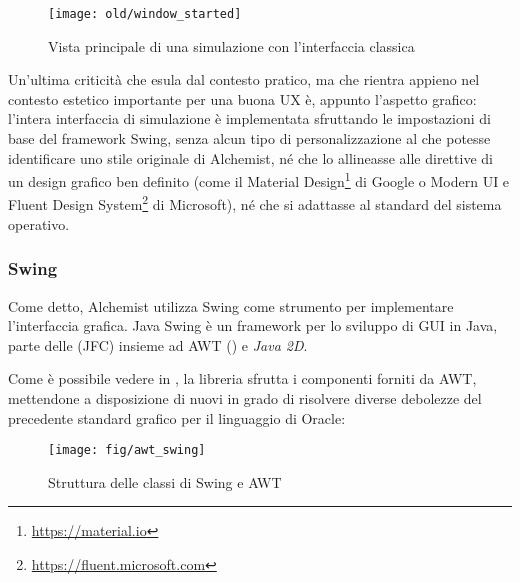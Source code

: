                 \begin{figure}[htbp]
                    \centering
                    \texttt{[image: old/window\_started]}
                    \caption{Vista principale di una simulazione con l'interfaccia classica}
                    \label{fig:oldMain}
                \end{figure}

                Un'ultima criticità che esula dal contesto pratico, ma che rientra appieno nel contesto estetico importante per una buona UX è, appunto l'aspetto grafico:
                l'intera interfaccia di simulazione è implementata sfruttando le impostazioni di base del framework Swing, senza alcun tipo di personalizzazione al  che potesse identificare uno stile originale di Alchemist, né che lo allineasse alle direttive di un design grafico ben definito (come il Material Design\footnote{\url{https://material.io}} di Google o Modern UI e Fluent Design System\footnote{\url{https://fluent.microsoft.com}} di Microsoft), né che si adattasse al  standard del sistema operativo.

            \subsubsection{Swing}\label{subsubsec:swing}
                Come detto, Alchemist utilizza Swing come strumento per implementare l'interfaccia grafica.
                Java Swing è un framework per lo sviluppo di GUI in Java, parte delle  (JFC) insieme ad AWT () e \emph{Java 2D}.

                Come è possibile vedere in , la libreria sfrutta i componenti forniti da AWT, mettendone a disposizione di nuovi in grado di risolvere diverse debolezze del precedente standard grafico per il linguaggio di Oracle:

                \begin{figure}[htbp]
                    \centering
                    \texttt{[image: fig/awt\_swing]}
                    \caption{Struttura delle classi di Swing e AWT}
                    \label{fig:awt}
                \end{figure}

